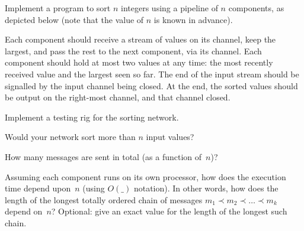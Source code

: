 \begin{question}
Implement a program to sort $n$ integers using a pipeline of $n$
components, as depicted below (note that the value of $n$ is known in
advance).
%
\begin{center}
\end{center}
%
Each component should receive a stream of values on its  channel,
keep the largest, and pass the rest to the next component, via its
 channel.  Each component should hold at most two values at any
time: the most recently received value and the largest seen so far.  The end
of the input stream should be signalled by the input channel being closed.  At
the end, the sorted values should be output on the right-most channel, and
that channel closed.

Implement a testing rig for the sorting network.

Would your network sort more than $n$ input values?

How many messages are sent in total (as a function of~$n$)?

Assuming each component runs on its own processor, how does the execution time
depend upon~$n$ (using $O(\_)$ notation).  In other words, how does the length
of the longest totally ordered chain of messages \( m_1 \prec m_2 \prec \ldots
\prec m_k \) depend on~$n$?  Optional: give an exact value for the length of
the longest such chain.
\end{question}


